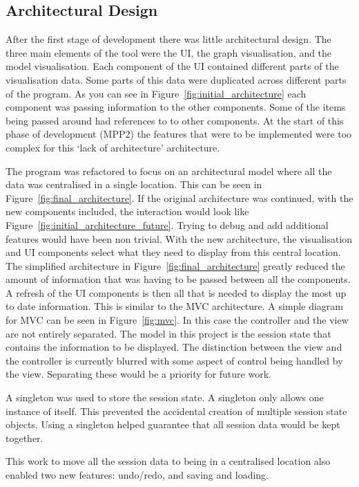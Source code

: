 \subsection{Architectural Design}
\label{sec:architecture}
After the first stage of development there was little architectural design.  The three main elements of the tool were the \ac{UI}, the graph visualisation, and the model visualisation.  Each component of the \ac{UI} contained different parts of the visualisation data.  Some parts of this data were duplicated across different parts of the program.   As you can see in Figure~\ref{fig:initial_architecture} each component was passing information to the other components.  Some of the items being passed around had references to to other components.  At the start of this phase of development (MPP2) the features that were to be implemented were too complex for this `lack of architecture' architecture.

The program was refactored to focus on an architectural model where all the data was centralised in a single location.  This can be seen in Figure~\ref{fig:final_architecture}.  If the original architecture was continued, with the new components included, the interaction would look like Figure~\ref{fig:initial_architecture_future}.  Trying to debug and add additional features would have been non trivial.  With the new architecture, the visualisation and \ac{UI} components select what they need to display from this central location.  The simplified architecture in Figure~\ref{fig:final_architecture} greatly reduced the amount of information that was having to be passed between all the components.  A refresh of the \ac{UI} components is then all that is needed to display the most up to date information.  This is similar to the \ac{MVC} architecture.  A simple diagram for \ac{MVC} can be seen in Figure~\ref{fig:mvc}.  In this case the controller and the view are not entirely separated.  The model in this project is the session state that contains the information to be displayed.  The distinction between the view and the controller is currently blurred with some aspect of control being handled by the view.  Separating these would be a priority for future work.

A singleton was used to store the session state.  A singleton only allows one instance of itself.  This prevented the accidental creation of multiple session state objects.  Using a singleton helped guarantee that all session data would be kept together.

This work to move all the session data to being in a centralised location also enabled two new features: undo/redo, and saving and loading.

